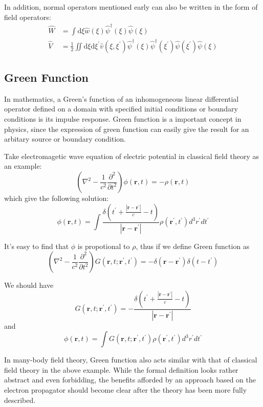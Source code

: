 \documentclass[bachelor, english]{ustcthesis}
\begin{document}
In addition, normal operators mentioned early can also be written in the form of field operators:
$$
\begin{aligned} \hat{W} &=\int \mathrm{d} \xi \hat{w}(\xi) \hat{\psi}^{\dagger}(\xi) \hat{\psi}(\xi) \\ \hat{V} &=\frac{1}{2} \iint \mathrm{d} \xi \mathrm{d} \xi^{\prime} \hat{v}\left(\xi, \xi^{\prime}\right) \hat{\psi}^{\dagger}(\xi) \hat{\psi}^{\dagger}\left(\xi^{\prime}\right) \hat{\psi}\left(\xi^{\prime}\right) \hat{\psi}(\xi) \end{aligned}
$$

\subsection{Green Function}

In mathematics, a Green's function of an inhomogeneous linear differential operator defined on a domain with specified initial conditions or boundary conditions is its impulse response.
Green function is a important concept in physics, since the expression of green function can easily give the result for an arbitary source or boundary condition.

Take electromagetic wave equation of electric potential in classical field theory as an example:
$$
\left(\nabla^{2}-\frac{1}{c^2}\frac{\partial^{2}}{\partial t^{2}}\right) \phi(\mathbf{r},t)=-\rho(\mathbf{r},t)
$$
which give the following solution:
$$
\phi(\mathbf{r}, t)=\int \frac{\delta\left(t^{\prime}+\frac{\left|\mathbf{r}-\mathbf{r}^{\prime}\right|}{c}-t\right)}{\left|\mathbf{r}-\mathbf{r}^{\prime}\right|} \rho\left(\mathbf{r}^{\prime}, t^{\prime}\right) d^{3} r^{\prime} d t^{\prime}
$$

It's easy to find that $\phi$ is propotional to $\rho$, thus if we define Green function as
$$
\left(\nabla^{2}-\frac{1}{c^2}\frac{\partial^{2}}{\partial t^{2}}\right) G(\mathbf{r},t;\mathbf{r^{\prime}},t^{\prime})=-\delta(\mathbf{r}-\mathbf{r^\prime})\delta(t-t^{\prime})
$$

We should have
$$
G(\mathbf{r},t;\mathbf{r^{\prime}},t^{\prime})=
-\frac{\delta\left(t^{\prime}+\frac{\left|\mathbf{r}-\mathbf{r}^{\prime}\right|}{c}-t\right)}{\left|\mathbf{r}-\mathbf{r}^{\prime}\right|}
$$
and
$$
\phi(\mathbf{r}, t)=
\int G(\mathbf{r},t;\mathbf{r^{\prime}},t^{\prime}) \rho\left(\mathbf{r}^{\prime}, t^{\prime}\right) d^{3} r^{\prime} d t^{\prime}
$$

In many-body field theory, Green function also acts similar with that of classical field theory in the above example.
While the formal definition looks rather abstract and even forbidding, the benefits afforded by an approach based on the electron propagator should become clear after the theory has been more fully described.
\end{document}
